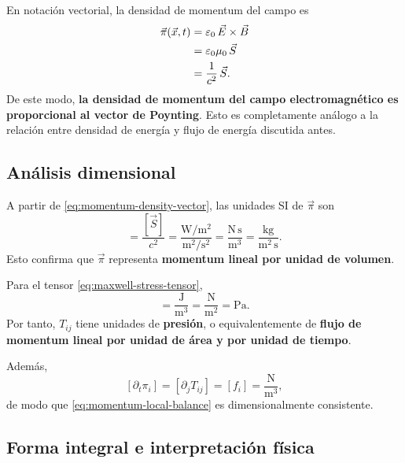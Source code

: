 \documentclass[../main.tex]{subfiles}
\begin{document}
En notación vectorial, la densidad de momentum del campo es
\begin{align}
    \vec\pi(\vec x,t)
    &=\varepsilon_0\,\vec{E}\times\vec{B} \notag\\
    &=\varepsilon_0\mu_0\,\vec S \notag\\
    &=\frac{1}{c^2}\,\vec S.
    \label{eq:momentum-density-vector}
\end{align}
De este modo, \textbf{la densidad de momentum del campo electromagnético es proporcional al vector de Poynting}. Esto es completamente análogo a la relación entre densidad de energía y flujo de energía discutida antes.

\subsection*{Análisis dimensional}

A partir de \eqref{eq:momentum-density-vector}, las unidades SI de $\vec\pi$ son
\begin{equation}
    [\vec\pi]
    =
    \frac{[\vec S]}{c^2}
    =
    \frac{\mathrm{W}/\mathrm{m}^2}{\mathrm{m}^2/\mathrm{s}^2}
    =
    \frac{\mathrm{N\,s}}{\mathrm{m}^3}
    =
    \frac{\mathrm{kg}}{\mathrm{m}^2\,\mathrm{s}}.
    \label{eq:units-pi}
\end{equation}
Esto confirma que $\vec\pi$ representa \textbf{momentum lineal por unidad de volumen}.

Para el tensor \eqref{eq:maxwell-stress-tensor},
\begin{equation}
    [T_{ij}]
    =
    \frac{\mathrm{J}}{\mathrm{m}^3}
    =
    \frac{\mathrm{N}}{\mathrm{m}^2}
    =
    \mathrm{Pa}.
    \label{eq:units-T}
\end{equation}
Por tanto, $T_{ij}$ tiene unidades de \textbf{presión}, o equivalentemente de \textbf{flujo de momentum lineal por unidad de área y por unidad de tiempo}.

Además,
\begin{equation}
    \left[\partial_t\pi_i\right]
    =
    \left[\partial_jT_{ij}\right]
    =
    [f_i]
    =
    \frac{\mathrm{N}}{\mathrm{m}^3},
    \label{eq:units-local-momentum-balance}
\end{equation}
de modo que \eqref{eq:momentum-local-balance} es dimensionalmente consistente.

\subsection*{Forma integral e interpretación física}
\end{document}
